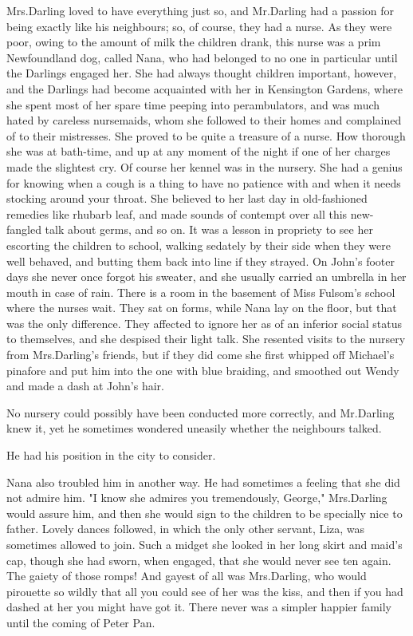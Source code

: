 Mrs.\@ Darling loved to have everything just so, and Mr.\@ Darling had a passion for being exactly like his neighbours;
so, of course, they had a nurse.
As they were poor, owing to the amount of milk the children drank, this nurse was a prim Newfoundland dog, called Nana, who had belonged to no one in particular until the Darlings engaged her.
She had always thought children important, however, and the Darlings had become acquainted with her in Kensington Gardens, where she spent most of her spare time peeping into perambulators, and was much hated by careless nursemaids, whom she followed to their homes and complained of to their mistresses.
She proved to be quite a treasure of a nurse.
How thorough she was at bath-time, and up at any moment of the night if one of her charges made the slightest cry.
Of course her kennel was in the nursery.
She had a genius for knowing when a cough is a thing to have no patience with and when it needs stocking around your throat.
She believed to her last day in old-fashioned remedies like rhubarb leaf, and made sounds of contempt over all this new-fangled talk about germs, and so on.
It was a lesson in propriety to see her escorting the children to school, walking sedately by their side when they were well behaved, and butting them back into line if they strayed.
On John's footer days she never once forgot his sweater, and she usually carried an umbrella in her mouth in case of rain.
There is a room in the basement of Miss Fulsom's school where the nurses wait.
They sat on forms, while Nana lay on the floor, but that was the only difference.
They affected to ignore her as of an inferior social status to themselves, and she despised their light talk.
She resented visits to the nursery from Mrs.\@ Darling's friends, but if they did come she first whipped off Michael's pinafore and put him into the one with blue braiding, and smoothed out Wendy and made a dash at John's hair.

No nursery could possibly have been conducted more correctly, and Mr.\@ Darling knew it, yet he sometimes wondered uneasily whether the neighbours talked.

He had his position in the city to consider.

Nana also troubled him in another way.
He had sometimes a feeling that she did not admire him.
"I know she admires you tremendously, George," Mrs.\@ Darling would assure him, and then she would sign to the children to be specially nice to father.
Lovely dances followed, in which the only other servant, Liza, was sometimes allowed to join.
Such a midget she looked in her long skirt and maid's cap, though she had sworn, when engaged, that she would never see ten again.
The gaiety of those romps!
And gayest of all was Mrs.\@ Darling, who would pirouette so wildly that all you could see of her was the kiss, and then if you had dashed at her you might have got it.
There never was a simpler happier family until the coming of Peter Pan.

